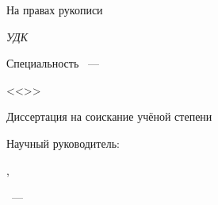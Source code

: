 \thispagestyle{empty}

\begin{center}
\thesisOrganization \par
\par
\end{center}

\vspace{10mm}
\begin{flushright}
На правах рукописи

{\sl УДК \thesisUdk}
\end{flushright}

\vspace{10mm}
\begin{center}
{\large \thesisAuthor}
\end{center}

\vspace{5mm}
\begin{center}
{\bf \large \thesisTitle
\par}

\vspace{10mm}
{%
Специальность \thesisSpecialtyNumber~---

<<\thesisSpecialtyTitle>>
}

\vspace{10mm}
Диссертация на соискание учёной степени

\thesisDegree
\end{center}

\vspace{10mm}
\begin{flushright}
Научный руководитель:

\supervisorRegalia, \\
\supervisorRegaliaSecondShort

\supervisorFio

\end{flushright}

\vspace{20mm}
\begin{center}
{\thesisCity~--- \thesisYear}
\end{center}

\newpage

